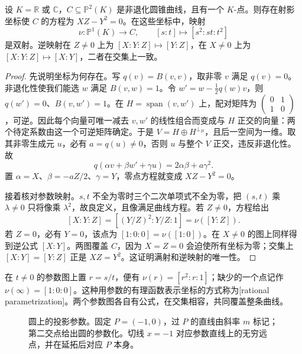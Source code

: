 \begin{proposition}\label{g1:prop:conic-parametrization}
	设 \(K=\mathbb R\) 或 \(\mathbb C\)，\(C\subseteq\mathbb P^2(K)\) 是非退化圆锥曲线，且有一个 \(K\)-点。则存在射影坐标使 \(C\) 的方程为 \(XZ-Y^2=0\)。在这些坐标中，映射
	\begin{equation}\label{g1:eq:conic-parametrization}
		\nu:\mathbb P^1(K)\longrightarrow C,
		\qquad [s:t]\longmapsto[s^2:st:t^2]
	\end{equation}
	是双射。逆映射在 \(Z\ne0\) 上为 \([X:Y:Z]\mapsto[Y:Z]\)，在 \(X\ne0\) 上为 \([X:Y:Z]\mapsto[X:Y]\)，二者在交集上一致。
\end{proposition}
\begin{proof}
	先说明坐标为何存在。写 \(q(v)=B(v,v)\)，取非零 \(v\) 满足 \(q(v)=0\)。非退化性使我们能选 \(w\) 满足 \(B(v,w)=1\)。令 \(w'=w-\frac12q(w)v\)，则 \(q(w')=0\)、\(B(v,w')=1\)。在 \(H=\operatorname{span}(v,w')\) 上，配对矩阵为 \(\left(\begin{smallmatrix}0&1\\1&0\end{smallmatrix}\right)\)，可逆。因此每个向量可唯一减去 \(v,w'\) 的线性组合而变成与 \(H\) 正交的向量：两个待定系数由这一个可逆矩阵确定。于是 \(V=H\oplus H^{\perp_B}\)，且后一空间为一维。取其非零生成元 \(u\)，必有 \(a=q(u)\ne0\)，否则 \(u\) 与整个 \(V\) 正交，违反非退化性。故
	\[
		q(\alpha v+\beta w'+\gamma u)=2\alpha\beta+a\gamma^2.
	\]
	置 \(\alpha=X\)、\(\beta=-aZ/2\)、\(\gamma=Y\)，零点方程就变成 \(XZ-Y^2=0\)。

	接着核对参数映射。\(s,t\) 不全为零时三个二次单项式不全为零，把 \((s,t)\) 乘 \(\lambda\ne0\) 只将像乘 \(\lambda^2\)，故良定义，且像满足曲线方程。若 \(Z\ne0\)，方程给出
	\[
		[X:Y:Z]=[(Y/Z)^2:Y/Z:1]=\nu([Y:Z]).
	\]
	若 \(Z=0\)，必有 \(Y=0\)，该点为 \([1:0:0]=\nu([1:0])\)。在 \(X\ne0\) 的图上同样得到逆公式 \([X:Y]\)。两图覆盖 \(C\)，因为 \(X=Z=0\) 会迫使所有坐标为零；交集上 \([X:Y]=[Y:Z]\) 正是 \(XZ=Y^2\)。这证明满射和逆映射的唯一性。
\end{proof}

在 \(t\ne0\) 的参数图上置 \(r=s/t\)，便有 \(\nu(r)=[r^2:r:1]\)；缺少的一个点记作 \(\nu(\infty)=[1:0:0]\)。这种用参数的有理函数表示坐标的方式称为[rational parametrization]。两个参数图各自有公式，在交集相容，共同覆盖整条曲线。

\begin{figure}[htbp]
	\centering
	
	\caption[圆上的投影参数]{圆上的投影参数。固定 \(P=(-1,0)\)，过 \(P\) 的直线由斜率 \(m\) 标记；第二交点给出圆的参数化。切线 \(x=-1\) 对应参数直线上的无穷远点，并在延拓后对应 \(P\) 本身。}
	\label{g1:fig:conic-projection}
\end{figure}

